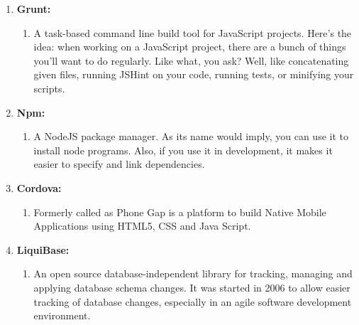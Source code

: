\begin{enumerate}
		\item \textbf{Grunt:}
		\begin{enumerate}
			\item[] A task-based command line build tool for JavaScript projects. Here's the idea: when working on a JavaScript project, there are a bunch of things you'll want to do regularly. Like what, you ask? Well, like concatenating given files, running JSHint on your code, running tests, or minifying your scripts.
		\end{enumerate}
		
		\item \textbf{Npm:}	
		\begin{enumerate}
			\item[] A NodeJS package manager. As its name would imply, you can use it to install node programs. Also, if you use it in development, it makes it easier to specify and link dependencies.
		\end{enumerate}
		
		\item \textbf{Cordova:}	
		\begin{enumerate}
			\item[] Formerly called as Phone Gap is a platform to build Native Mobile Applications using HTML5, CSS and Java Script.
		\end{enumerate}
		
		\item \textbf{LiquiBase:}
		\begin{enumerate}
			\item[] An open source database-independent library for tracking, managing and applying database schema changes. It was started in 2006 to allow easier tracking of database changes, especially in an agile software development environment.	
		\end{enumerate}
	\end{enumerate}